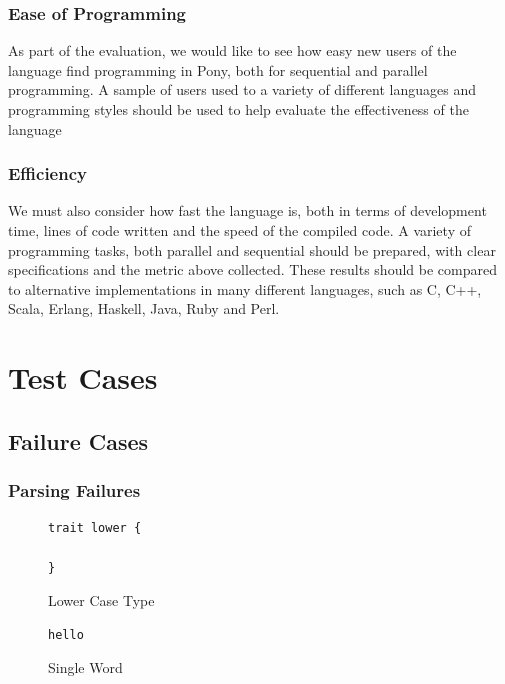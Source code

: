 \documentclass[11pt,a4paper]{report}
\begin{document}
\subsection{Ease of Programming}

As part of the evaluation, we would like to see how easy new users of the language find programming in Pony, both for sequential and parallel programming.
A sample of users used to a variety of different languages and programming styles should be used to help evaluate the effectiveness of the language

\subsection{Efficiency}

We must also consider how fast the language is, both in terms of development time, lines of code written and the speed of the compiled code.
A variety of programming tasks, both parallel and sequential should be prepared, with clear specifications and the metric above collected.
These results should be compared to alternative implementations in many different languages, such as C, C++, Scala, Erlang, Haskell, Java, Ruby and Perl.




\appendix
\chapter{Test Cases}
\label{app:test}

\section{Failure Cases}
\subsection{Parsing Failures}
\begin{figure}[H]
\begin{verbatim}
trait lower {

}
\end{verbatim}
\caption{Lower Case Type}
\end{figure}

\begin{figure}[H]
\begin{verbatim}
hello
\end{verbatim}
\caption{Single Word}
\end{figure}
\end{document}
